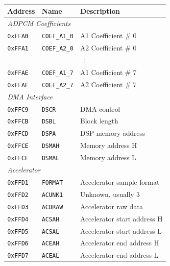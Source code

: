\documentclass[oneside,english,a4paper,10pt,oneside,openany,final]{memoir}
\newcommand{\Address}[1]{\texttt{#1}}
\newcommand{\Register}[1]{\texttt{#1}}
\begin{document}
\begin{table}[htb]
\centering
\begin{tabular}{|l|l|l|}
\hline
\textbf{Address} & \textbf{Name}      & \textbf{Description}          \\ \hline
\multicolumn{3}{|l|}{\textit{ADPCM Coefficients}}                     \\ \hline
\Address{0xFFA0} & \Register{COEF\_A1\_0} & A1 Coefficient \# 0       \\ \hline
\Address{0xFFA1} & \Register{COEF\_A2\_0} & A2 Coefficient \# 0       \\ \hline
\multicolumn{3}{|c|}{$\vdots$}                                        \\ \hline
\Address{0xFFAE} & \Register{COEF\_A1\_7} & A1 Coefficient \# 7       \\ \hline
\Address{0xFFAF} & \Register{COEF\_A2\_7} & A2 Coefficient \# 7       \\ \hline
\multicolumn{3}{|l|}{\textit{DMA Interface}}                          \\ \hline
\Address{0xFFC9} & \Register{DSCR}    & DMA control                   \\ \hline
\Address{0xFFCB} & \Register{DSBL}    & Block length                  \\ \hline
\Address{0xFFCD} & \Register{DSPA}    & DSP memory address            \\ \hline
\Address{0xFFCE} & \Register{DSMAH}   & Memory address H              \\ \hline
\Address{0xFFCF} & \Register{DSMAL}   & Memory address L              \\ \hline
\multicolumn{3}{|l|}{\textit{Accelerator}}                            \\ \hline
\Address{0xFFD1} & \Register{FORMAT}  & Accelerator sample format     \\ \hline
\Address{0xFFD2} & \Register{ACUNK1}  & Unknown, usually 3            \\ \hline
\Address{0xFFD3} & \Register{ACDRAW}  & Accelerator raw data          \\ \hline
\Address{0xFFD4} & \Register{ACSAH}   & Accelerator start address H   \\ \hline
\Address{0xFFD5} & \Register{ACSAL}   & Accelerator start address L   \\ \hline
\Address{0xFFD6} & \Register{ACEAH}   & Accelerator end address H     \\ \hline
\Address{0xFFD7} & \Register{ACEAL}   & Accelerator end address L     \\ \hline

\end{tabular}
\end{table}
\end{document}
